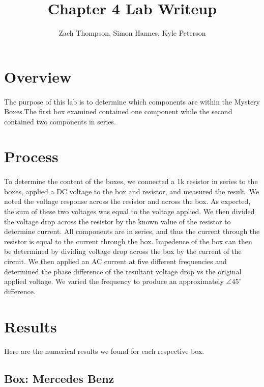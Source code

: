 \documentclass{article}
\title{\textbf{Chapter 4 Lab Writeup}}
\author{Zach Thompson, Simon Hannes, Kyle Peterson}
\begin{document}
\maketitle{}

\section*{Overview}
\paragraph{}
The purpose of this lab is to determine which components are within the Mystery
Boxes.The first box examined contained one component while the second contained
two components in series. 

\section*{Process}
\paragraph{}
To determine the content of the boxes, we connected a 1k resistor in series
to the boxes, applied a DC voltage to the box and resistor, and measured the
result. We noted the voltage response across the resistor and across the box.
As expected, the sum of these two voltages was equal to the voltage applied.
We then divided the voltage drop across the resistor by the known value of
the resistor to determine current. All components are in series, and thus the
current through the resistor is equal to the current through the box. Impedence
of the box can then be determined by dividing voltage drop across the box by
the current of the circuit. We then applied an AC current at five different
frequencies and determined the phase difference of the resultant voltage drop
vs the original applied voltage. We varied the frequency to produce an
approximately $\angle{}45^\circ{}$ difference.

\section*{Results}
\paragraph{}
Here are the numerical results we found for each respective box.

\subsection*{Box: Mercedes Benz}
\end{document}
